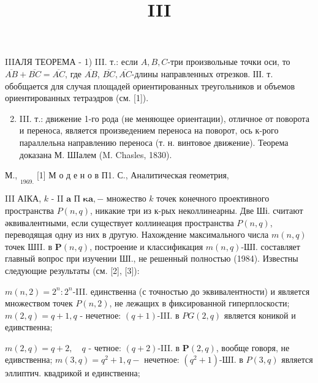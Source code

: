 \documentclass[10pt]{article}
\title{III }
\author{}
\date{}
\begin{document}
\maketitle

IIIАЛЯ ТЕОРЕМА - 1) III. т.: если $A, B, C$-три произвольные точки оси, то $\overline{A B}+\overline{B C}=\overline{A C}$, где $\overline{A B}$, $\overline{B C}, \overline{A C}$-длины направленных отрезков. ІІІ. т. обобщается для случая площадей ориентированных треугольников и объемов ориентированных тетраэдров (см. [1]).



\begin{enumerate}

  \setcounter{enumi}{1}

  \item III. т.: движение 1-го рода (не меняющее ориентации), отличное от поворота и переноса, является произведением переноса на поворот, ось к-рого параллельна направлению переноса (т. н. винтовое движение). Теорема доказана М. ШІалем (M. Chasles, 1830).

\end{enumerate}



М., $\underset{1969 .}{ }$ [1] М о д е н о в П1. С., Аналитическая геометрия,



III АIКА, $k$ - II $\mathbf{a}$ П $\mathbf{\kappa} \mathbf{a},-$ множество $k$ точек конечного проективного пространства $P(n, q)$, никакие три из к-рых неколлинеарны. Две Ші. считают әквивалентными, если существует коллинеация пространства $P(n, q)$, переводящая одну из них в другую. Нахождение максимального числа $m(n, q)$ точек ШII. в $\boldsymbol{P}(n, q)$, построение и классификация $m(n, q)$-ШІ. составляет главный вопрос при изучении ШІ., не решенный полностью (1984). Известны следующие результаты (см. [2], [3]):



$m(n, 2)=2^{n}: 2^{n}$-III. единственна (с точностью до эквивалентности) и является множеством точек $P(n, 2)$, не лежащих в фиксированной гиперплоскости; $m(2, q)=q+1, q$ - нечетное: $(q+1)$-III. в $P G(2, q)$ является коникой и едивственна;



$m(2, q)=q+2, \quad q$ - четное: $(q+2)$-III. в $\boldsymbol{P}(2, q)$, вообще говоря, не едивственна; $m(3, q)=q^{2}+1, q-$ нечетное: $\left(q^{2}+1\right)$-ШI. в $P(3, q)$ является эллиптич. квадрикой и единственна;
\end{document}
